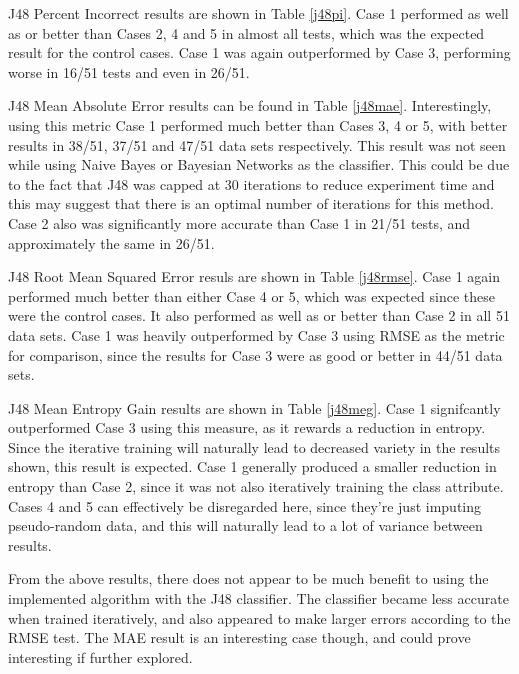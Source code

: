J48 Percent Incorrect results are shown in Table \ref{j48pi}. Case 1 performed as well as or better than Cases 2, 4 and 5 in almost all tests, which was the expected result for the control cases. Case 1 was again outperformed by Case 3, performing worse in 16/51 tests and even in 26/51. 

J48 Mean Absolute Error results can be found in Table \ref{j48mae}. Interestingly, using this metric Case 1 performed much better than Cases 3, 4 or 5, with better results in 38/51, 37/51 and 47/51 data sets respectively. This result was not seen while using Naive Bayes or Bayesian Networks as the classifier. This could be due to the fact that J48 was capped at 30 iterations to reduce experiment time and this may suggest that there is an optimal number of iterations for this method. Case 2 also was significantly more accurate than Case 1 in 21/51 tests, and approximately the same in 26/51.  

J48 Root Mean Squared Error resuls are shown in Table \ref{j48rmse}. Case 1 again performed much better than either Case 4 or 5, which was expected since these were the control cases. It also performed as well as or better than Case 2 in all 51 data sets. Case 1 was heavily outperformed by Case 3 using RMSE as the metric for comparison, since the results for Case 3 were as good or better in 44/51 data sets.

J48 Mean Entropy Gain results are shown in Table \ref{j48meg}. Case 1 signifcantly outperformed Case 3 using this measure, as it rewards a reduction in entropy. Since the iterative training will naturally lead to decreased variety in the results shown, this result is expected. Case 1 generally produced a smaller reduction in entropy than Case 2, since it was not also iteratively training the class attribute. Cases 4 and 5 can effectively be disregarded here, since they're just imputing pseudo-random data, and this will naturally lead to a lot of variance between results.

From the above results, there does not appear to be much benefit to using the implemented algorithm with the J48 classifier. The classifier became less accurate when trained iteratively, and also appeared to make larger errors according to the RMSE test. The MAE result is an interesting case though, and could prove interesting if further explored.





\FloatBarrier

